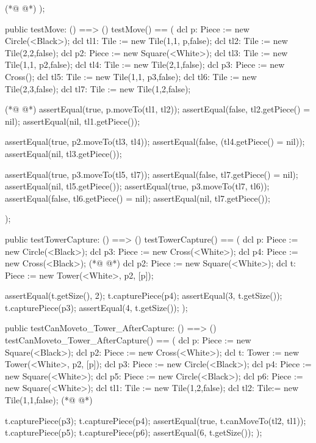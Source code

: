 \begin{vdmpp}[breaklines=true]
(*@
\label{testTowerCapture:210}
@*)
  );
  
  public testMove: () ==> ()
  testMove() == (
   dcl p: Piece := new Circle(<Black>);
   dcl tl1: Tile := new Tile(1,1, p,false);
   dcl tl2: Tile := new Tile(2,2,false);
   dcl p2: Piece := new Square(<White>);
   dcl tl3: Tile := new Tile(1,1, p2,false);
   dcl tl4: Tile := new Tile(2,1,false);
   dcl p3: Piece := new Cross();
   dcl tl5: Tile := new Tile(1,1, p3,false);
   dcl tl6: Tile := new Tile(2,3,false);
   dcl tl7: Tile := new Tile(1,2,false);
   
(*@
\label{testCanMoveto:Tower:AfterCapture:225}
@*)
   assertEqual(true, p.moveTo(tl1, tl2));
   assertEqual(false, tl2.getPiece() = nil);
   assertEqual(nil, tl1.getPiece());
   
   assertEqual(true, p2.moveTo(tl3, tl4));
   assertEqual(false, (tl4.getPiece() = nil));
   assertEqual(nil, tl3.getPiece());
   
   assertEqual(true, p3.moveTo(tl5, tl7));
   assertEqual(false, tl7.getPiece() = nil);
   assertEqual(nil, tl5.getPiece());
   assertEqual(true, p3.moveTo(tl7, tl6));
   assertEqual(false, tl6.getPiece() = nil);
   assertEqual(nil, tl7.getPiece());
  
  );
  
  public testTowerCapture: () ==> ()
  testTowerCapture() == (
   dcl p: Piece := new Circle(<Black>);
   dcl p3: Piece := new Cross(<White>);
   dcl p4: Piece := new Cross(<Black>);
(*@
\label{testTowerCaptureTower:247}
@*)
   dcl p2: Piece := new Square(<White>);
   dcl t: Piece := new Tower(<White>, p2, [p]);
   
   assertEqual(t.getSize(), 2);
   t.capturePiece(p4);
   assertEqual(3, t.getSize());
   t.capturePiece(p3);
   assertEqual(4, t.getSize());
  );
  
  public testCanMoveto_Tower_AfterCapture: () ==> ()
  testCanMoveto_Tower_AfterCapture() == (
   dcl p: Piece := new Square(<Black>);
   dcl p2: Piece := new Cross(<White>);
   dcl t: Tower := new Tower(<White>, p2, [p]);
   dcl p3: Piece := new Circle(<Black>);
   dcl p4: Piece := new Square(<White>);
   dcl p5: Piece := new Circle(<Black>);
   dcl p6: Piece := new Square(<White>);
   dcl tl1: Tile := new Tile(1,2,false);
   dcl tl2: Tile:= new Tile(1,1,false);
(*@
\label{testPieceMoveandCapture:268}
@*)
   
   t.capturePiece(p3);
   t.capturePiece(p4);
   assertEqual(true, t.canMoveTo(tl2, tl1));
   t.capturePiece(p5);
   t.capturePiece(p6);
   assertEqual(6, t.getSize());
  );  
  

\end{vdmpp}

